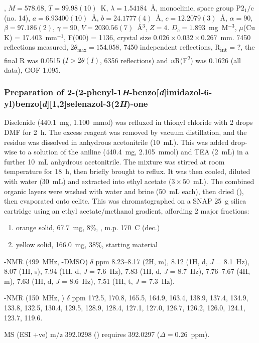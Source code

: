 \begin{refsection}
, $M=578.68$, $T=99.98(10)$~K, $\lambda=1.54184$~\AA, monoclinic, space group $\text{P}2_1/\text{c}$ (no. 14), $a = 6.93400(10)$~\AA, $b = 24.1777(4)$~\AA, $c = 12.2079(3)$~\AA, $\alpha = 90$\degree, $\beta = 97.186(2)$\degree, $\gamma = 90$\degree, $V = 2030.56(7)$~\AA$^{3}$, $Z = 4$. $D_{c}= 1.893$~mg~M$^{-3}$, $\mu$(Cu K\a) = 17.403~mm$^{-1}$, F(000) = 1136, crystal size $0.026 \times 0.032 \times 0.267$~mm. 7450 reflections measured, $2\theta_{\max}=154.058$\degree, 7450 independent reflections, R\textsubscript{int} = ?, the final R was 0.0515 ($I > 2\theta(I)$, 6356 reflections) and \emph{w}R(F\textsuperscript{2}) was 0.1626 (all data), GOF 1.095. 

\subsubsection[Preparation of \refcmpd{ebs-rhs-ph}]{Preparation of 2-(2-phenyl-1\emph{H}-benzo[\emph{d}]imidazol-6-yl)benzo[\emph{d}][1,2]\-selenazol-3(2\emph{H})-one }
Diselenide  (440.1~mg, 1.100~mmol) was refluxed in thionyl chloride with 2 drops DMF for 2~h.
The excess reagent was removed by vacuum distillation, and the residue was dissolved in anhydrous acetonitrile (10~mL).
This was added drop-wise to a solution of the aniline  (440.4~mg, 2.105~mmol) and TEA (2~mL) in a further 10~mL anhydrous acetonitrile.
The mixture was stirred at room temperature for 18~h, then briefly brought to reflux.
It was then cooled, diluted with water (30~mL) and extracted into ethyl acetate ($3\times50$~mL).
The combined organic layers were washed with water and brine (50~mL each), then dried (), then evaporated onto celite.
This was chromatographed on a SNAP 25~g silica cartridge using an ethyl acetate/methanol gradient, affording 2 major fractions:
\begin{enumerate}
    \item orange solid, 67.7~mg, 8\%, , m.p. 170~\degree{}C (dec.)
    \item yellow solid, 166.0~mg, 38\%, starting material 
\end{enumerate}

-NMR (499~MHz, -DMSO) $\delta$ ppm 8.23--8.17 (2H, m), 8.12 (1H, d, \textit{J} = 8.1~Hz), 8.07 (1H, s), 7.94 (1H, d, \textit{J} = 7.6~Hz), 7.83 (1H, d, \textit{J} = 8.7~Hz), 7.76--7.67 (4H, m), 7.63 (1H, d, \textit{J} = 8.6~Hz), 7.51 (1H, t, \textit{J} = 7.3~Hz).

-NMR (150~MHz, ) $\delta$ ppm 172.5, 170.8, 165.5, 164.9, 163.4, 138.9, 137.4, 134.9, 133.8, 132.5, 130.4, 129.5, 128.9, 128.4, 127.1, 127.0, 126.7, 126.2, 126.0, 124.1, 123.7, 119.6.

MS (ESI +ve) m/z 392.0298 ()  requires 392.0297 ($\Delta=0.26$~ppm).

\printbibliography[heading=subbibliography]
\end{refsection}
